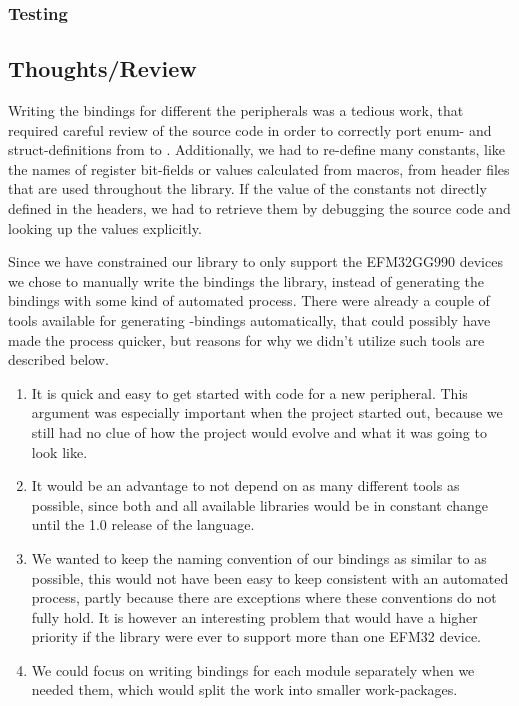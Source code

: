 
\subsubsection{Testing}
\label{ssub:testing}



\subsection{Thoughts/Review}

Writing the bindings for different the peripherals was a tedious work, that required careful review
of the \emlib source code in order to correctly port enum- and struct-definitions from \C to \rust.
Additionally, we had to re-define many constants, like the names of register bit-fields or values
calculated from \C macros, from header files that are used throughout the library. If the value of
the constants not directly defined in the headers, we had to retrieve them by debugging the source
code and looking up the values explicitly.

Since we have constrained our library to only support the EFM32GG990 devices we chose to manually
write the bindings the library, instead of generating the bindings with some kind of automated
process. There were already a couple of tools available for generating \C-bindings automatically,
that could possibly have made the process quicker, but reasons for why we didn't utilize such tools
are described below.

\begin{enumerate}
    \item It is quick and easy to get started with code for a new peripheral. This argument was
    especially important when the project started out, because we still had no clue of how the
    project would evolve and what it was going to look like.
    \item It would be an advantage to not depend on as many different tools as possible, since both
    \rust and all available libraries would be in constant change until the 1.0 release of the
    language.
    \item We wanted to keep the naming convention of our bindings as similar to \emlib as possible,
    this would not have been easy to keep consistent with an automated process, partly because there
    are exceptions where these conventions do not fully hold. It is however an interesting problem
    that would have a higher priority if the library were ever to support more than one EFM32
    device.
    \item We could focus on writing bindings for each module separately when we needed them, which
    would split the work into smaller work-packages.
\end{enumerate}
